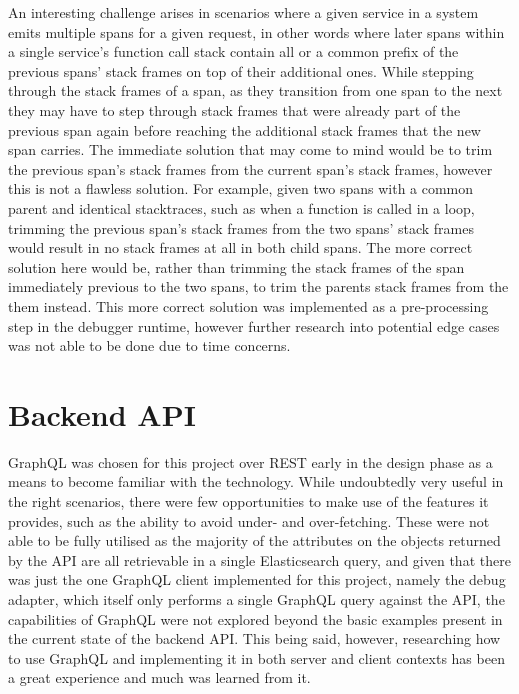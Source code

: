 \documentclass[12pt,pdftex,titlepage]{report}
\begin{document}
            An interesting challenge arises in scenarios where a given service in a system emits multiple spans for a given request, in other words where later spans within a single service's function call stack 
            contain all or a common prefix of the previous spans' stack frames on top of their additional ones. While stepping through the stack frames of a span, as they transition from one span to the next they 
            may have to step through stack frames that were already part of the previous span again before reaching the additional stack frames that the new span carries. The immediate solution that may come to mind
            would be to trim the previous span's stack frames from the current span's stack frames, however this is not a flawless solution. For example, given two spans with a common parent and identical stacktraces,
            such as when a function is called in a loop, trimming the previous span's stack frames from the two spans' stack frames would result in no stack frames at all in both child spans. The more correct solution 
            here would be, rather than trimming the stack frames of the span immediately previous to the two spans, to trim the parents stack frames from the them instead. This more correct solution was implemented as a 
            pre-processing step in the debugger runtime, however further research into potential edge cases was not able to be done due to time concerns.

        \section{Backend API}
            GraphQL was chosen for this project over REST early in the design phase as a means to become familiar with the technology. While undoubtedly very useful in the right scenarios, there were few opportunities to make 
            use of the features it provides, such as the ability to avoid under- and over-fetching. These were not able to be fully utilised as the majority of the attributes on the objects returned by the API are all retrievable in 
            a single Elasticsearch query, and given that there was just the one GraphQL client implemented for this project, namely the debug adapter, which itself only performs a single GraphQL query against the API, the capabilities 
            of GraphQL were not explored beyond the basic examples present in the current state of the backend API. This being said, however, researching how to use GraphQL and implementing it in both server and client contexts has 
            been a great experience and much was learned from it.
\end{document}
